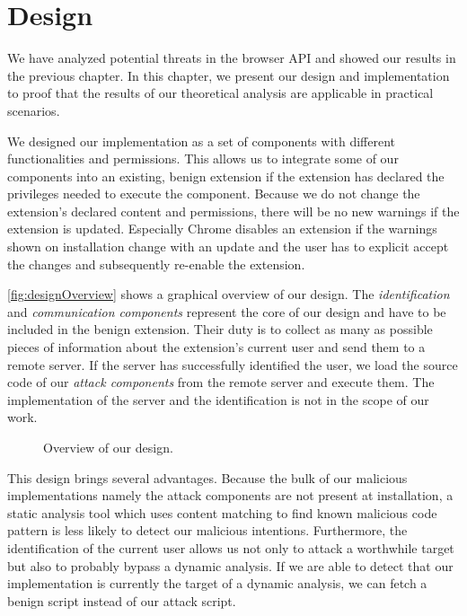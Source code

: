 
\chapter{Design}
\label{chp:design}

	We have analyzed potential threats in the browser API and showed our results in the previous chapter. In this chapter, we present our design and implementation to proof that the results of our theoretical analysis are applicable in practical scenarios. 
	
	We designed our implementation as a set of components with different functionalities and permissions. This allows us to integrate some of our components into an existing, benign extension if the extension has declared the privileges needed to execute the component. Because we do not change the extension's declared content and permissions, there will be no new warnings if the extension is updated. Especially Chrome disables an extension if the warnings shown on installation change with an update and the user has to explicit accept the changes and subsequently re-enable the extension. 
	
	\autoref{fig:designOverview} shows a graphical overview of our design. The \textit{identification} and \textit{communication components} represent the core of our design and have to be included in the benign extension. Their duty is to collect as many as possible pieces of information about the extension's current user and send them to a remote server. If the server has successfully identified the user, we load the source code of our \textit{attack components} from the remote server and execute them. The implementation of the server and the identification is not in the scope of our work. 
	
	\begin{figure}[h]
		\centering
		\def\svgscale{0.8}
		
		\caption{Overview of our design.}
		\label{fig:designOverview}
	\end{figure}
	
	This design brings several advantages. Because the bulk of our malicious implementations namely the attack components are not present at installation, a static analysis tool which uses content matching to find known malicious code pattern is less likely to detect our malicious intentions. Furthermore, the identification of the current user allows us not only to attack a worthwhile target but also to probably bypass a dynamic analysis. If we are able to detect that our implementation is currently the target of a dynamic analysis, we can fetch a benign script instead of our attack script. 

